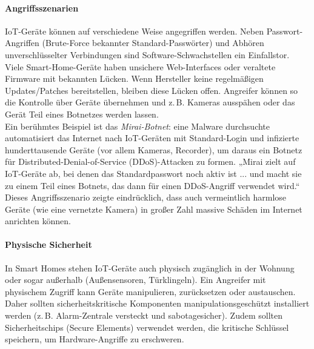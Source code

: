 \paragraph{Angriffsszenarien}
IoT-Geräte können auf verschiedene Weise angegriffen werden. Neben Passwort-Angriffen (Brute-Force bekannter Standard-Passwörter) und Abhören unverschlüsselter Verbindungen sind Software-Schwachstellen ein Einfallstor. Viele Smart-Home-Geräte haben unsichere Web-Interfaces oder veraltete Firmware mit bekannten Lücken. Wenn Hersteller keine regelmäßigen Updates/Patches bereitstellen, bleiben diese Lücken offen. Angreifer können so die Kontrolle über Geräte übernehmen und z.\,B. Kameras ausspähen oder das Gerät Teil eines Botnetzes werden lassen.
\\
Ein berühmtes Beispiel ist das \emph{Mirai-Botnet}: eine Malware durchsuchte automatisiert das Internet nach IoT-Geräten mit Standard-Login und infizierte hunderttausende Geräte (vor allem Kameras, Recorder), um daraus ein Botnetz für Distributed-Denial-of-Service (DDoS)-Attacken zu formen. \autocite{proofpoint} „Mirai zielt auf IoT-Geräte ab, bei denen das Standardpasswort noch aktiv ist ... und macht sie zu einem Teil eines Botnets, das dann für einen DDoS-Angriff verwendet wird.“ Dieses Angriffsszenario zeigte eindrücklich, dass auch vermeintlich harmlose Geräte (wie eine vernetzte Kamera) in großer Zahl massive Schäden im Internet anrichten können. \autocite{proofpoint}
\\
\paragraph{Physische Sicherheit}
In Smart Homes stehen IoT-Geräte auch physisch zugänglich in der Wohnung oder sogar außerhalb (Außensensoren, Türklingeln). Ein Angreifer mit physischem Zugriff kann Geräte manipulieren, zurücksetzen oder austauschen. Daher sollten sicherheitskritische Komponenten manipulationsgeschützt installiert werden (z.\,B. Alarm-Zentrale versteckt und sabotagesicher). Zudem sollten Sicherheitschips (Secure Elements) verwendet werden, die kritische Schlüssel speichern, um Hardware-Angriffe zu erschweren.
\\
